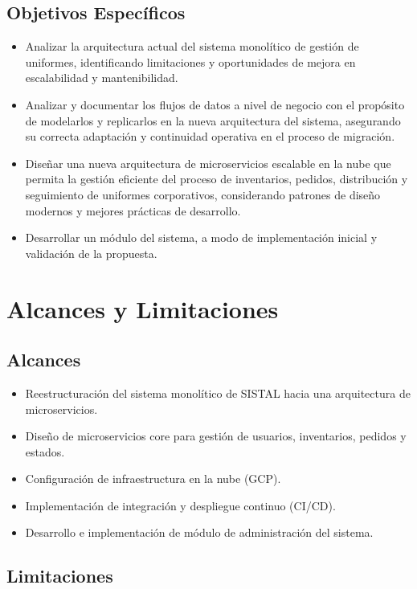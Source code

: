 \subsection{Objetivos Específicos}

\begin{itemize}
    \item Analizar la arquitectura actual del sistema monolítico de gestión de uniformes, identificando limitaciones y oportunidades de mejora en escalabilidad y mantenibilidad.
    \item Analizar y documentar los flujos de datos a nivel de negocio con el propósito de modelarlos y replicarlos en la nueva arquitectura del sistema, asegurando su correcta adaptación y continuidad operativa en el proceso de migración.
    \item Diseñar una nueva arquitectura de microservicios escalable en la nube que permita la gestión eficiente del proceso de inventarios, pedidos, distribución y seguimiento de uniformes corporativos, considerando patrones de diseño modernos y mejores prácticas de desarrollo.
    \item Desarrollar un módulo del sistema, a modo de implementación inicial y validación de la propuesta.
\end{itemize}


\section{Alcances y Limitaciones}

\subsection{Alcances}

\begin{itemize}
    \item Reestructuración del sistema monolítico de SISTAL hacia una arquitectura de microservicios.
    \item Diseño de microservicios core para gestión de usuarios, inventarios, pedidos y estados.
    \item Configuración de infraestructura en la nube (GCP).
    \item Implementación de integración y despliegue continuo (CI/CD).
    \item Desarrollo e implementación de módulo de administración del sistema.
\end{itemize}

\subsection{Limitaciones}

